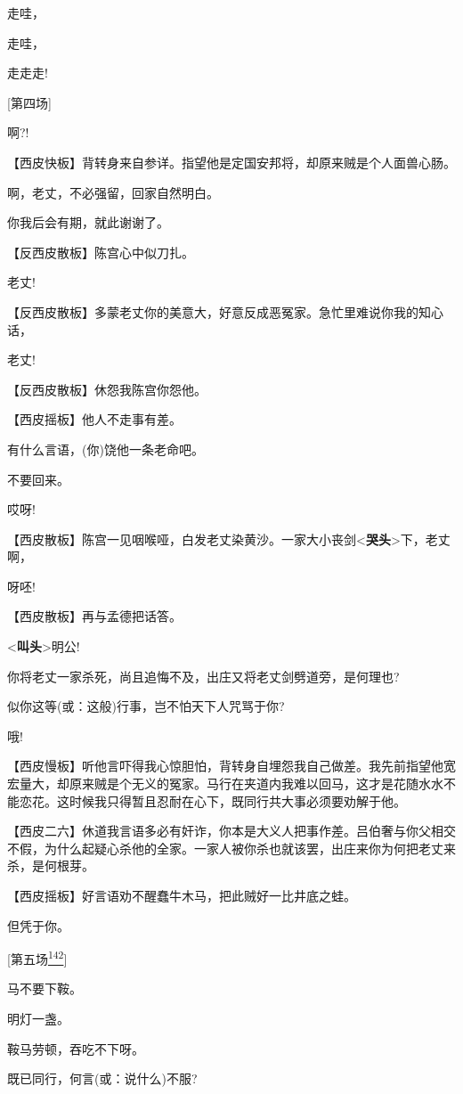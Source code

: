 走哇，

走哇，

走走走!

{[}第四场{]}

啊?!

【西皮快板】背转身来自参详。指望他是定国安邦将，却原来贼是个人面兽心肠。

啊，老丈，不必强留，回家自然明白。

你我后会有期，就此谢谢了。

【反西皮散板】陈宫心中似刀扎。

老丈!

【反西皮散板】多蒙老丈你的美意大，好意反成恶冤家。急忙里难说你我的知心话，

老丈!

【反西皮散板】休怨我陈宫你怨他。

【西皮摇板】他人不走事有差。

有什么言语，(你)饶他一条老命吧。

不要回来。

哎呀!

【西皮散板】陈宫一见咽喉哑，白发老丈染黄沙。一家大小丧剑\textless{}\textbf{哭头}\textgreater{}下，老丈啊，

呀呸!

【西皮散板】再与孟德把话答。

\textless{}\textbf{叫头}\textgreater{}明公!

你将老丈一家杀死，尚且追悔不及，出庄又将老丈剑劈道旁，是何理也?

似你这等(或：这般)行事，岂不怕天下人咒骂于你?

哦!

【西皮慢板】听他言吓得我心惊胆怕，背转身自埋怨我自己做差。我先前指望他宽宏量大，却原来贼是个无义的冤家。马行在夹道内我难以回马，这才是花随水水不能恋花。这时候我只得暂且忍耐在心下，既同行共大事必须要劝解于他。

【西皮二六】休道我言语多必有奸诈，你本是大义人把事作差。吕伯奢与你父相交不假，为什么起疑心杀他的全家。一家人被你杀也就该罢，出庄来你为何把老丈来杀，是何根芽。

【西皮摇板】好言语劝不醒蠢牛木马，把此贼好一比井底之蛙。

但凭于你。

{[}第五场\protect\hyperlink{fn142}{\textsuperscript{142}}{]}

马不要下鞍。

明灯一盏。

鞍马劳顿，吞吃不下呀。

既已同行，何言(或：说什么)不服?

